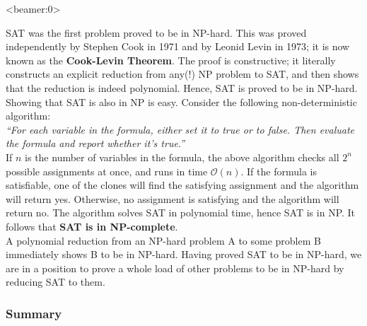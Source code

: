 \documentclass[handout, 12pt]{beamer}
\newcommand{\bigo}[1]{\mathcal{O}\mathopen{}\left(#1\right)\mathclose{}}
\begin{document}
\begin{frame}<beamer:0>

\footnotesize
SAT was the first problem proved to be in NP-hard. This was proved independently by Stephen Cook in 1971 and by Leonid Levin in 1973; it is now known as the \textbf{Cook-Levin Theorem}. The proof is constructive; it literally constructs an explicit reduction from any(!) NP problem to SAT, and then shows that the reduction is indeed polynomial. Hence, SAT is proved to be in NP-hard.
\\[0.6em]
Showing that SAT is also in NP is easy. Consider the following non-deterministic algorithm:
\\[0.6em]
\textit{``For each variable in the formula, either set it to true or to false. Then evaluate the formula and report whether it's true.''}
\\[0.6em]
If $n$ is the number of variables in the formula, the above algorithm checks all $2^n$ possible assignments at once, and runs in time $\bigo{n}$. If the formula is satisfiable, one of the clones will find the satisfying assignment and the algorithm will return yes. Otherwise, no assignment is satisfying and the algorithm will return no. The algorithm solves SAT in polynomial time, hence SAT is in NP. It follows that \textbf{SAT is in NP-complete}.
\\[0.6em]
A polynomial reduction from an NP-hard problem A to some problem B immediately shows B to be in NP-hard. Having proved SAT to be in NP-hard, we are in a position to prove a whole load of other problems to be in NP-hard by reducing SAT to them.

\end{frame}

\begin{frame}

\frametitle{Summary}

\centering
{}

\end{frame}
\end{document}
